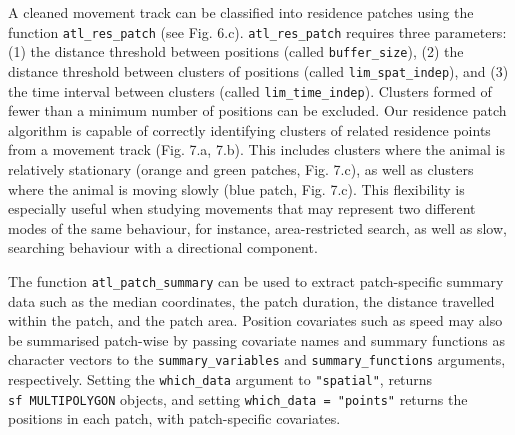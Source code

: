 \documentclass[10pt,paper=a4,headings=standardclasses
]{scrartcl}
\begin{document}
A cleaned movement track can be classified into residence patches using the function \texttt{atl\_res\_patch} (see Fig. 6.c).
\texttt{atl\_res\_patch} requires three parameters: (1) the distance threshold between positions (called \texttt{buffer\_size}), (2) the distance threshold between clusters of positions (called \texttt{lim\_spat\_indep}), and (3) the time interval between clusters (called \texttt{lim\_time\_indep}).
Clusters formed of fewer than a minimum number of positions can be excluded.
Our residence patch algorithm is capable of correctly identifying clusters of related residence points from a movement track (Fig. 7.a, 7.b).
This includes clusters where the animal is relatively stationary (orange and green patches, Fig. 7.c), as well as clusters where the animal is moving slowly (blue patch, Fig. 7.c).
This flexibility is especially useful when studying movements that may represent two different modes of the same behaviour, for instance, area-restricted search, as well as slow, searching behaviour with a directional component.

The function \texttt{atl\_patch\_summary} can be used to extract patch-specific summary data such as the median coordinates, the patch duration, the distance travelled within the patch, and the patch area.
Position covariates such as speed may also be summarised patch-wise by passing covariate names and  summary functions as character vectors to the \texttt{summary\_variables} and \texttt{summary\_functions} arguments, respectively.
Setting the \texttt{which\_data} argument to \texttt{"spatial"}, returns \texttt{sf\ MULTIPOLYGON} objects, and setting \texttt{which\_data = "points"} returns the positions in each patch, with patch-specific covariates.
\end{document}
